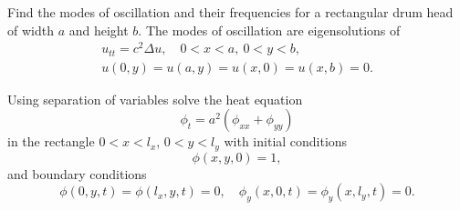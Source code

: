 {\begin{Exercise}
\end{Exercise}




\begin{Exercise}
  \label{exercise rectangular drum head modes}
  Find the modes of oscillation and their frequencies for a rectangular 
  drum head of width $a$ and height $b$.  The modes of oscillation are 
  eigensolutions of
  \begin{gather*}
    u_{t t} = c^2 \Delta u, \quad 0 < x < a,\ 0 < y < b, \\
    u(0,y) = u(a,y) = u(x,0) = u(x,b) = 0.
  \end{gather*}

\end{Exercise}




\begin{Exercise}
  \label{exercise separation pt=a2pxx+pyy}
  Using separation of variables solve the heat equation
  \[
  \phi_t = a^2\left(\phi_{xx} + \phi_{yy}\right)
  \]
  in the rectangle $0 < x < l_x$, $0 < y < l_y$ with initial conditions
  \[
  \phi(x,y,0) = 1,
  \]
  and boundary conditions
  \[
  \phi(0,y,t) = \phi(l_x,y,t) = 0,\quad
  \phi_y(x,0,t) = \phi_y(x,l_y,t) = 0.
  \]

\end{Exercise}






}
